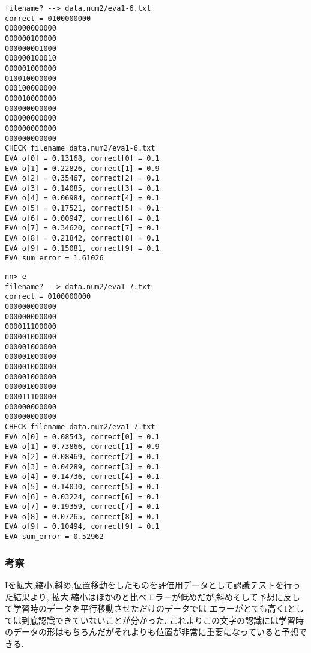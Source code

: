 \begin{lstlisting}[caption=学習時のデータ斜め,label=ラベル]
filename? --> data.num2/eva1-6.txt    
correct = 0100000000
000000000000
000000100000
000000001000
000000100010
000001000000
010010000000
000100000000
000010000000
000000000000
000000000000
000000000000
000000000000
CHECK filename data.num2/eva1-6.txt
EVA o[0] = 0.13168, correct[0] = 0.1
EVA o[1] = 0.22826, correct[1] = 0.9
EVA o[2] = 0.35467, correct[2] = 0.1
EVA o[3] = 0.14085, correct[3] = 0.1
EVA o[4] = 0.06984, correct[4] = 0.1
EVA o[5] = 0.17521, correct[5] = 0.1
EVA o[6] = 0.00947, correct[6] = 0.1
EVA o[7] = 0.34620, correct[7] = 0.1
EVA o[8] = 0.21842, correct[8] = 0.1
EVA o[9] = 0.15081, correct[9] = 0.1
EVA sum_error = 1.61026
\end{lstlisting}

\begin{lstlisting}[caption=学習時のデータ縮小,label=ラベル]
nn> e
filename? --> data.num2/eva1-7.txt 
correct = 0100000000
000000000000
000000000000
000011100000
000001000000
000001000000
000001000000
000001000000
000001000000
000001000000
000011100000
000000000000
000000000000
CHECK filename data.num2/eva1-7.txt
EVA o[0] = 0.08543, correct[0] = 0.1
EVA o[1] = 0.73866, correct[1] = 0.9
EVA o[2] = 0.08469, correct[2] = 0.1
EVA o[3] = 0.04289, correct[3] = 0.1
EVA o[4] = 0.14736, correct[4] = 0.1
EVA o[5] = 0.14030, correct[5] = 0.1
EVA o[6] = 0.03224, correct[6] = 0.1
EVA o[7] = 0.19359, correct[7] = 0.1
EVA o[8] = 0.07265, correct[8] = 0.1
EVA o[9] = 0.10494, correct[9] = 0.1
EVA sum_error = 0.52962
\end{lstlisting}

\subsubsection{考察}
Iを拡大,縮小,斜め,位置移動をしたものを評価用データとして認識テストを行った結果より,
拡大,縮小はほかのと比べエラーが低めだが,斜めそして予想に反して学習時のデータを平行移動させただけのデータでは
エラーがとても高くIとしては到底認識できていないことが分かった.
これよりこの文字の認識には学習時のデータの形はもちろんだがそれよりも位置が非常に重要になっていると予想できる.